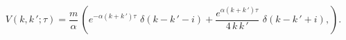 \begin{equation}\label{V(k,k,tau)}
V(k,k\,';\tau)=\frac{m}{\alpha}\,\left(
e^{-\alpha(k+k\,')\tau}\,\,\delta(k-k\,'-i)+
\frac{e^{\alpha(k+k\,')\tau}}{4\,k\,k\,'}\,\,\delta(k-k\,'+i),
\right). 
\end{equation}

